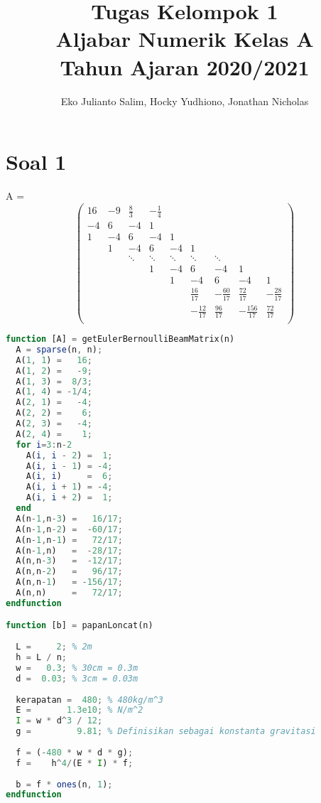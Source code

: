 \documentclass[12pt, a4paper, onecolumn, oneside, final]{report}
\title{Tugas Kelompok 1\\Aljabar Numerik Kelas A\\Tahun Ajaran 2020/2021}
\author{Eko Julianto Salim, Hocky Yudhiono, Jonathan Nicholas}
\begin{document}
\maketitle



\section*{Soal 1}

A =
\begin{equation*}
	\begin{pmatrix}
		16 & -9 & \frac{8}{3} & -\frac{1}{4} \\
		-4 & 6 & -4 & 1 \\
		1 & -4 & 6 & -4 & 1 \\
		  & 1 & -4 & 6 & -4 & 1 \\
		  & & \ddots & \ddots & \ddots & \ddots & \ddots \\
		  & & & 1 & -4 & 6 & -4 & 1 \\
		  & & & & 1 & -4 & 6 & -4 & 1 \\
		  & & & & & \frac{16}{17} & -\frac{60}{17} & \frac{72}{17} & -\frac{28}{17} \\
		  & & & & & -\frac{12}{17} & \frac{96}{17} & -\frac{156}{17} & \frac{72}{17} \\ 
	\end{pmatrix}
\end{equation*}

\begin{lstlisting}[language=Octave]
function [A] = getEulerBernoulliBeamMatrix(n)
  A = sparse(n, n);
  A(1, 1) =   16;
  A(1, 2) =   -9;
  A(1, 3) =  8/3;
  A(1, 4) = -1/4;
  A(2, 1) =   -4;
  A(2, 2) =    6;
  A(2, 3) =   -4;
  A(2, 4) =    1;
  for i=3:n-2
    A(i, i - 2) =  1;
    A(i, i - 1) = -4;
    A(i, i)     =  6;
    A(i, i + 1) = -4;
    A(i, i + 2) =  1;
  end
  A(n-1,n-3) =   16/17;
  A(n-1,n-2) =  -60/17;
  A(n-1,n-1) =   72/17;
  A(n-1,n)   =  -28/17;
  A(n,n-3)   =  -12/17;
  A(n,n-2)   =   96/17;
  A(n,n-1)   = -156/17;
  A(n,n)     =   72/17;
endfunction

function [b] = papanLoncat(n)
 
  L =     2; % 2m
  h = L / n;
  w =   0.3; % 30cm = 0.3m
  d =  0.03; % 3cm = 0.03m
  
  kerapatan =  480; % 480kg/m^3
  E =       1.3e10; % N/m^2
  I = w * d^3 / 12;
  g =         9.81; % Definisikan sebagai konstanta gravitasi
  
  f = (-480 * w * d * g);
  f =    h^4/(E * I) * f;
  
  b = f * ones(n, 1);
endfunction
\end{lstlisting}
\end{document}
